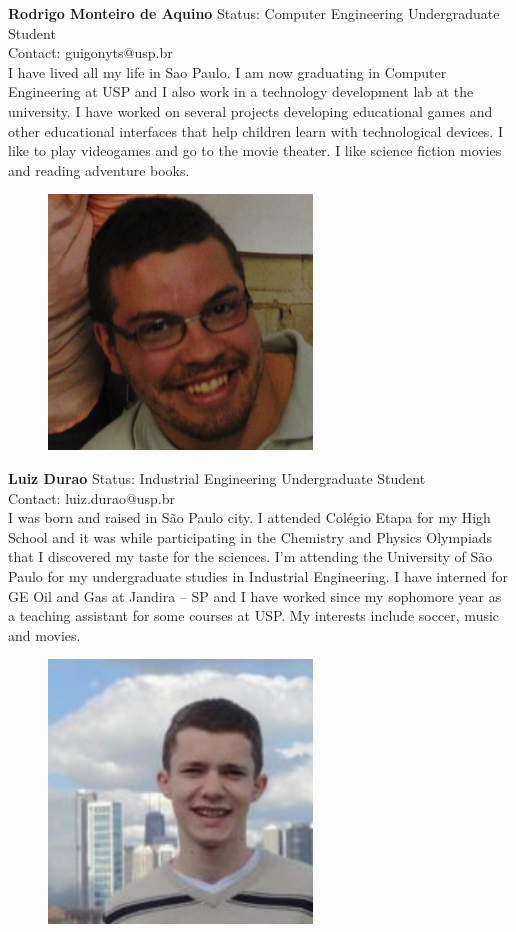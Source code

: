 \textbf{Rodrigo Monteiro de Aquino}
Status: Computer Engineering Undergraduate Student \\
Contact: guigonyts@usp.br \\
I have lived all my life in Sao Paulo. I am now graduating in Computer Engineering at USP and I also work in a technology development lab at the university. I have worked on several projects developing educational games and other educational interfaces that help children learn with technological devices.  I like to play videogames and go to the movie theater. I like science fiction movies and reading adventure books.

\begin{figure}[h]
  \centering
     \includegraphics[width=7cm]{images/image015}
  \label{fig:15}
\end{figure}

\textbf{Luiz Durao}
Status: Industrial Engineering Undergraduate Student \\
Contact: luiz.durao@usp.br \\
I was born and raised in São Paulo city. I attended Colégio Etapa for my High School and it was while participating in the Chemistry and Physics Olympiads that I discovered my taste for the sciences. I’m attending the University of São Paulo for my undergraduate studies in Industrial Engineering. I have interned for GE Oil and Gas at Jandira – SP and I have worked since my sophomore year as a teaching assistant for some courses at USP. My interests include soccer, music and movies.

\begin{figure}[h]
  \centering
     \includegraphics[width=7cm]{images/image016}
  \label{fig:16}
\end{figure}

